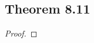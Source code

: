 \documentclass[../../main.tex]{subfiles}
\begin{document}
\subsection{Theorem 8.11}
\begin{wts}

\end{wts}
\begin{proof}

\end{proof}
\end{document}
